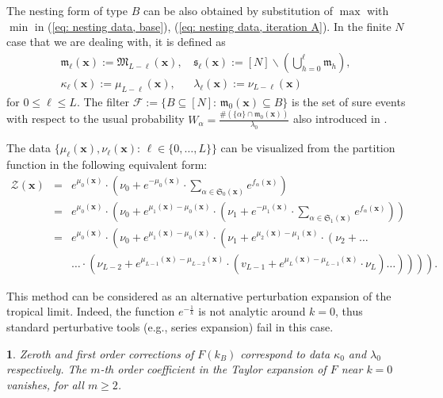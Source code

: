 \documentclass[11pt,british,reqno]{article}
\numberwithin{equation}{section}
\numberwithin{figure}{section}
\numberwithin{table}{section}
\theoremstyle{definition}
\theoremstyle{definition}
\theoremstyle{plain}
\theoremstyle{plain}
\newtheorem{proposition}{\protect\propositionname}
\theoremstyle{remark}
\theoremstyle{plain}
\numberwithin{equation}{section}
\numberwithin{figure}{section}
\numberwithin{table}{section}
\theoremstyle{plain}
\providecommand{\propositionname}{Proposition}
\begin{document}
The nesting form of type $B$ can be also obtained by substitution
of $\max$ with $\min$ in (\ref{eq: nesting data, base}), (\ref{eq: nesting data, iteration A}).
In the finite $N$ case that we are dealing with, it is defined as
\begin{eqnarray}
\mathfrak{m}_{\ell}(\boldsymbol{x}):=\mathfrak{M}_{L-\ell}(\boldsymbol{x}),\, & \mathfrak{s}_{\ell}(\boldsymbol{x}):=[N]\backslash\left({\displaystyle \bigcup_{h=0}^{\ell}}\mathfrak{m}_{h}\right),\nonumber \\
\kappa_{\ell}(\boldsymbol{x}):=\mu_{L-\ell}(\boldsymbol{x}),\, & \lambda_{\ell}(\boldsymbol{x}):=\nu_{L-\ell}(\boldsymbol{x})\label{eq: nesting data, iteration, finite, B} 
\end{eqnarray}
for $0\leq\ell\leq L$. The filter $\mathcal{F}:=\{B\subseteq[N]:\,\mathfrak{m}_{0}(\boldsymbol{x})\subseteq B\}$
is the set of sure events with respect to the usual probability ${\displaystyle {\displaystyle W}_{\alpha}=\frac{\#\left(\{\alpha\}\cap\mathfrak{m}_{0}(\boldsymbol{x})\right)}{\lambda_{0}}}$
also introduced in \cite{AK2015}. 

The data $\{\mu_{\ell}(\boldsymbol{x}),\nu_{\ell}(\boldsymbol{x}):\,\ell\in\{0,\dots,L\}\}$
can be visualized from the partition function in the following equivalent
form: 
\begin{eqnarray}
\mathcal{Z}(\boldsymbol{x}) & = & e^{\mu_{0}(\boldsymbol{x})}\cdot\left(\nu_{0}+e^{-\mu_{0}(\boldsymbol{x})}\cdot\sum_{\alpha\in\mathfrak{S}_{0}(\boldsymbol{x})}e^{f_{\alpha}(\boldsymbol{x})}\right)\nonumber \\
& = & e^{\mu_{0}(\boldsymbol{x})}\cdot\left(\nu_{0}+e^{\mu_{1}(\boldsymbol{x})-\mu_{0}(\boldsymbol{x})}\cdot\left(\nu_{1}+e^{-\mu_{1}(\boldsymbol{x})}\cdot\sum_{\alpha\in\mathfrak{S}_{1}(\boldsymbol{x})}e^{f_{\alpha}(\boldsymbol{x})}\right)\right)\nonumber \\
& = & e^{\mu_{0}(\boldsymbol{x})}\cdot\left(\nu_{0}+e^{\mu_{1}(\boldsymbol{x})-\mu_{0}(\boldsymbol{x})}\cdot\left(\nu_{1}+e^{\mu_{2}(\boldsymbol{x})-\mu_{1}(\boldsymbol{x})}\cdot\left(\nu_{2}+\dots\right.\right.\right. \nonumber \\
 & & \left.\left.\left.\left.\dots\cdot\left(\nu_{L-2}+e^{\mu_{L-1}(\boldsymbol{x})-\mu_{L-2}(\boldsymbol{x})}\cdot\right.\left(v_{L-1}+e^{\mu_{L}(\boldsymbol{x})-\mu_{L-1}(\boldsymbol{x})}\cdot\nu_{L}\right)\dots\right)\right)\right)\right).\label{eq: nested partition function} 
\end{eqnarray}

This method can be considered as an alternative perturbation expansion
of the tropical limit. Indeed, the function ${\displaystyle e^{-\frac{1}{k}}}$
is not analytic around $k=0$, thus standard perturbative tools (e.g.,
series expansion) fail in this case. 
\begin{proposition}
\label{prop: trivial naive perturbation at m>1} Zeroth and first
order corrections of $F(k_{B})$ correspond to data $\kappa_{0}$
and $\lambda_{0}$ respectively. The $m$-th order coefficient in
the Taylor expansion of $F$ near $k=0$ vanishes, for all $m\geq2$. 
\end{proposition}
\end{document}
